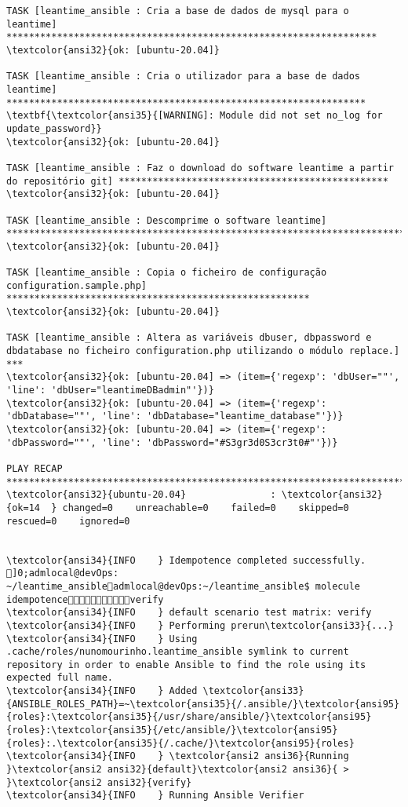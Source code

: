 \documentclass{scrartcl}
\begin{document}
\begin{Verbatim}
TASK [leantime_ansible : Cria a base de dados de mysql para o leantime] ******************************************************************
\textcolor{ansi32}{ok: [ubuntu-20.04]}

TASK [leantime_ansible : Cria o utilizador para a base de dados leantime] ****************************************************************
\textbf{\textcolor{ansi35}{[WARNING]: Module did not set no_log for update_password}}
\textcolor{ansi32}{ok: [ubuntu-20.04]}

TASK [leantime_ansible : Faz o download do software leantime a partir do repositório git] ************************************************
\textcolor{ansi32}{ok: [ubuntu-20.04]}

TASK [leantime_ansible : Descomprime o software leantime] ********************************************************************************
\textcolor{ansi32}{ok: [ubuntu-20.04]}

TASK [leantime_ansible : Copia o ficheiro de configuração configuration.sample.php] ******************************************************
\textcolor{ansi32}{ok: [ubuntu-20.04]}

TASK [leantime_ansible : Altera as variáveis dbuser, dbpassword e dbdatabase no ficheiro configuration.php utilizando o módulo replace.] ***
\textcolor{ansi32}{ok: [ubuntu-20.04] => (item={'regexp': 'dbUser=""', 'line': 'dbUser="leantimeDBadmin"'})}
\textcolor{ansi32}{ok: [ubuntu-20.04] => (item={'regexp': 'dbDatabase=""', 'line': 'dbDatabase="leantime_database"'})}
\textcolor{ansi32}{ok: [ubuntu-20.04] => (item={'regexp': 'dbPassword=""', 'line': 'dbPassword="#S3gr3d0S3cr3t0#"'})}

PLAY RECAP *******************************************************************************************************************************
\textcolor{ansi32}{ubuntu-20.04}               : \textcolor{ansi32}{ok=14  } changed=0    unreachable=0    failed=0    skipped=0    rescued=0    ignored=0


\textcolor{ansi34}{INFO    } Idempotence completed successfully.
]0;admlocal@devOps: ~/leantime_ansibleadmlocal@devOps:~/leantime_ansible$ molecule idempotenceverify
\textcolor{ansi34}{INFO    } default scenario test matrix: verify
\textcolor{ansi34}{INFO    } Performing prerun\textcolor{ansi33}{...}
\textcolor{ansi34}{INFO    } Using .cache/roles/nunomourinho.leantime_ansible symlink to current repository in order to enable Ansible to find the role using its expected full name.
\textcolor{ansi34}{INFO    } Added \textcolor{ansi33}{ANSIBLE_ROLES_PATH}=~\textcolor{ansi35}{/.ansible/}\textcolor{ansi95}{roles}:\textcolor{ansi35}{/usr/share/ansible/}\textcolor{ansi95}{roles}:\textcolor{ansi35}{/etc/ansible/}\textcolor{ansi95}{roles}:.\textcolor{ansi35}{/.cache/}\textcolor{ansi95}{roles}
\textcolor{ansi34}{INFO    } \textcolor{ansi2 ansi36}{Running }\textcolor{ansi2 ansi32}{default}\textcolor{ansi2 ansi36}{ > }\textcolor{ansi2 ansi32}{verify}
\textcolor{ansi34}{INFO    } Running Ansible Verifier


\end{Verbatim}
\end{document}
